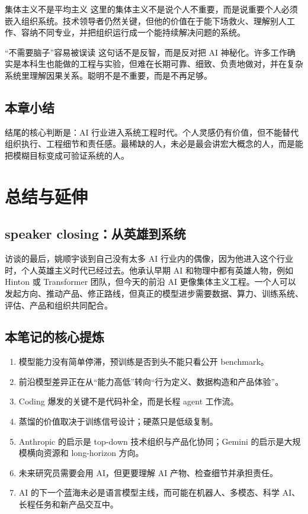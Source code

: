 \documentclass[a4paper]{article}
\begin{document}
\begin{knowledgebox}{集体主义不是平均主义}
这里的集体主义不是说个人不重要，而是说重要个人必须嵌入组织系统。技术领导者仍然关键，但他的价值在于能下场救火、理解别人工作、容纳不同专业，并把组织运行成一个能持续解决问题的系统。
\end{knowledgebox}

\begin{warningbox}{“不需要脑子”容易被误读}
这句话不是反智，而是反对把 AI 神秘化。许多工作确实是本科生也能做的工程与实验，但难在长期可靠、细致、负责地做对，并在复杂系统里理解因果关系。聪明不是不重要，而是不再足够。
\end{warningbox}

\subsection{本章小结}

结尾的核心判断是：AI 行业进入系统工程时代。个人灵感仍有价值，但不能替代组织执行、工程细节和责任感。最稀缺的人，未必是最会讲宏大概念的人，而是能把模糊目标变成可验证系统的人。

\section{总结与延伸}

\subsection{ speaker closing：从英雄到系统}

访谈的最后，姚顺宇谈到自己没有太多 AI 行业内的偶像，因为他进入这个行业时，个人英雄主义时代已经过去。他承认早期 AI 和物理中都有英雄人物，例如 Hinton 或 Transformer 团队，但今天的前沿 AI 更像集体主义工程。一个人可以发起方向、推动产品、修正路线，但真正的模型进步需要数据、算力、训练系统、评估、产品和组织共同配合。

\subsection{本笔记的核心提炼}

\begin{enumerate}
\item 模型能力没有简单停滞，预训练是否到头不能只看公开 benchmark。
\item 前沿模型差异正在从“能力高低”转向“行为定义、数据构造和产品体验”。
\item Coding 爆发的关键不是代码补全，而是长程 agent 工作流。
\item 蒸馏的价值取决于训练信号设计；硬蒸只是低级复制。
\item Anthropic 的启示是 top-down 技术组织与产品化协同；Gemini 的启示是大规模横向资源和 long-horizon 方向。
\item 未来研究员需要会用 AI，但更要理解 AI 产物、检查细节并承担责任。
\item AI 的下一个蓝海未必是语言模型主线，而可能在机器人、多模态、科学 AI、长程任务和新产品交互中。
\end{enumerate}
\end{document}
